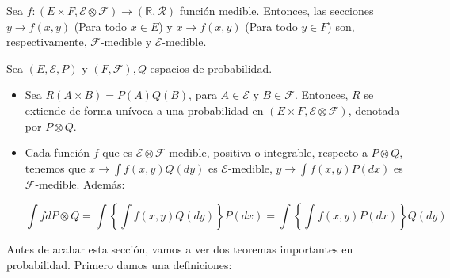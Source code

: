 \begin{theorem}
	Sea $f: (E\times F, \mathcal{E} \otimes \mathcal{F}) \rightarrow (\mathbb{R}, \mathcal{R})$ función medible. Entonces, las secciones $y \rightarrow f(x, y)$ (Para todo $x \in E$) y $x \rightarrow f(x, y)$ (Para todo $y \in F$) son, respectivamente, $\mathcal{F}$-medible y $\mathcal{E}$-medible.
\end{theorem}

\begin{theorem}
	Sea $(E, \mathcal{E}, P)$ y $(F, \mathcal{F}), Q$ espacios de probabilidad. 

	\begin{itemize}
		\item Sea $R(A \times B) = P(A)Q(B)$, para $A \in \mathcal{E}$ y $B \in \mathcal{F}$. Entonces, $R$ se extiende de forma unívoca a una probabilidad en $(E \times F, \mathcal{E} \otimes \mathcal{F})$, denotada por $P \otimes Q$.

		\item Cada función $f$ que es $\mathcal{E} \otimes \mathcal{F}$-medible, positiva o integrable, respecto a $P \otimes Q$, tenemos que $x \rightarrow \int f(x,y) Q(dy)$ es $\mathcal{E}$-medible, $y \rightarrow \int f(x,y) P(dx)$ es $\mathcal{F}$-medible. Además:

		\[
			\int f dP\otimes Q = \int \left\{ \int f(x,y) Q(dy) \right\} P(dx) = \int \left\{ \int f(x,y) P(dx) \right\} Q(dy)
		\]

	\end{itemize}

\end{theorem}


Antes de acabar esta sección, vamos a ver dos teoremas importantes en probabilidad. Primero damos una definiciones:

